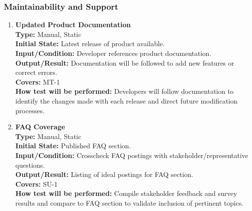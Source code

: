 \documentclass[12pt, titlepage]{article}
\begin{document}
\subsubsection{Maintainability and Support}
\begin{enumerate}[label=\bfseries MS-\arabic*:, wide=0pt]
  \item \label{test-MS1} \textbf{Updated Product Documentation}\\[2mm]
    {\bf Type:} Manual, Static\\
    {\bf Initial State:} Latest release of product available.\\
    {\bf Input/Condition:} Developer references product documentation.\\
    {\bf Output/Result:} Documentation will be followed to add new features or correct errors.\\
    {\bf Covers:} MT-1\\
    {\bf How test will be performed:} Developers will follow documentation to identify the changes made with each release and direct future modification processes.

  \item \label{test-MS2} \textbf{FAQ Coverage}\\[2mm]
    {\bf Type:} Manual, Static\\
    {\bf Initial State:} Published FAQ section.\\
    {\bf Input/Condition:} Crosscheck FAQ postings with stakeholder/representative questions.\\
    {\bf Output/Result:} Listing of ideal postings for FAQ section.\\
    {\bf Covers:} SU-1\\
    {\bf How test will be performed:} Compile stakeholder feedback and survey results and compare to FAQ section to validate inclusion of pertinent topics.
\end{enumerate}
\end{document}
